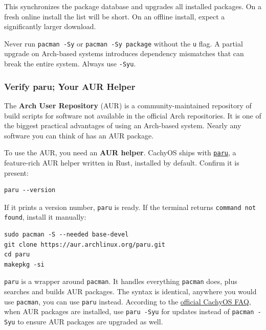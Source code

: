 \documentclass{article}
\newcommand{\code}[1]{\colorbox{codebg}{\texttt{#1}}}
\begin{document}
This synchronizes the package database and upgrades all installed packages. On a
fresh online install the list will be short. On an offline install, expect a
significantly larger download.

\begin{tcolorbox}[arc=12pt, outer arc=10pt,
  colback=red!5!white, colframe=red!60!black,
  title=\textbf{Warning}]
  Never run \code{pacman -Sy} or \code{pacman -Sy package} without the \code{u}
  flag. A partial upgrade on Arch-based systems introduces dependency
  mismatches that can break the entire system. Always use \code{-Syu}.
\end{tcolorbox}

\subsubsection{Verify paru; Your AUR Helper}

The \textbf{Arch User Repository} (AUR) is a community-maintained repository of
build scripts for software not available in the official Arch repositories. It is one
of the biggest practical advantages of using an Arch-based system. Nearly any
software you can think of has an AUR package.

To use the AUR, you need an \textbf{AUR helper}. CachyOS ships with
\href{https://github.com/morganamilo/paru}{\code{paru}}, a feature-rich AUR helper
written in Rust, installed by default. Confirm it is present:

\begin{verbatim}
paru --version
\end{verbatim}

If it prints a version number, \code{paru} is ready. If the terminal returns
\code{command not found}, install it manually:

\begin{verbatim}
sudo pacman -S --needed base-devel
git clone https://aur.archlinux.org/paru.git
cd paru
makepkg -si
\end{verbatim}

\begin{tcolorbox}[arc=12pt, outer arc=10pt,
  colback=blue!4!white, colframe=blue!40!black,
  title=\textbf{paru vs pacman}]
  \code{paru} is a wrapper around \code{pacman}. It handles everything \code{pacman}
  does, plus searches and builds AUR packages. The syntax is identical, anywhere
  you would use \code{pacman}, you can use \code{paru} instead. According to the
  \href{https://wiki.cachyos.org/cachyos_basic/faq/}{official CachyOS FAQ}, when AUR
  packages are installed, use \code{paru -Syu} for updates instead of \code{pacman
  -Syu} to ensure AUR packages are upgraded as well.
\end{tcolorbox}
\end{document}
